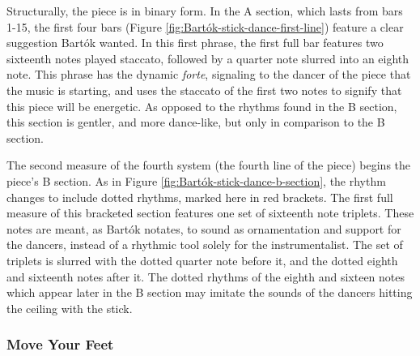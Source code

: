 Structurally, the piece is in binary form. In the A section, which lasts from bars 1-15, the first four bars (Figure \ref{fig:Bartók-stick-dance-first-line}\autocite{Lung_2016}) feature a clear suggestion Bartók wanted. In this first phrase, the first full bar features two sixteenth notes played staccato, followed by a quarter note slurred into an eighth note. This phrase has the dynamic \textit{forte}, signaling to the dancer of the piece that the music is starting, and uses the staccato of the first two notes to signify that this piece will be energetic. As opposed to the rhythms found in the B section, this section is gentler, and more dance-like, but only in comparison to the B section. 

The second measure of the fourth system (the fourth line of the piece) begins the piece's B section. As in Figure \ref{fig:Bartók-stick-dance-b-section}\autocite{Lung_2016}, the rhythm changes to include dotted rhythms, marked here in red brackets. The first full measure of this bracketed section features one set of sixteenth note triplets. These notes are meant, as Bartók notates, to sound as ornamentation and support for the dancers, instead of a rhythmic tool solely for the instrumentalist. The set of triplets is slurred with the dotted quarter note before it, and the dotted eighth and sixteenth notes after it. The dotted rhythms of the eighth and sixteen notes which appear later in the B section may imitate the sounds of the dancers hitting the ceiling with the stick.

\subsubsection{Move Your Feet}

